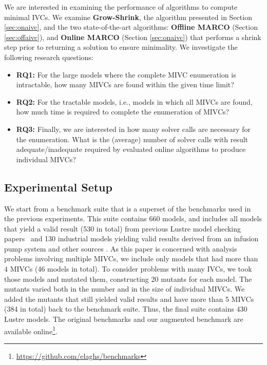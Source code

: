 We are interested in examining the performance of algorithms to compute minimal IVCs.
We examine \textbf{Grow-Shrink}, the algorithm presented in Section \ref{sec:onaivc}, and the two state-of-the-art algorithms: \textbf{Offline MARCO} (\aivcalg Section \ref{sec:offaivc}), and \textbf{Online MARCO} (Section \ref{sec:onaivc}) that performs a shrink step prior to returning a solution to ensure minimality.
We investigate the following research questions:
\begin{itemize}
  \item \textbf{RQ1:} For the large models where the complete MIVC enumeration is intractable,
how many MIVCs are found within the given time limit?
  \item \textbf{RQ2:} For the tractable models, i.e., models in which all MIVCs are found, how much time is required to complete the enumeration of MIVCs?
  \item \textbf{RQ3:} Finally, we are interested in how many solver calls are necessary for the enumeration. What is the (average) number of solver calls with result adequate/inadequate required by evaluated online algorithms to produce individual MIVCs?
\end{itemize}

\subsection{Experimental Setup}
  We start from a benchmark suite that is a superset of the benchmarks used in the previous experiments. This suite contains 660 models, and includes all models that yield a valid result (530 in total) from previous Lustre model checking papers~\cite{Hagen08:FMCAD,piskac2016} and 130 industrial models yielding valid results derived from an infusion pump system \cite{hilt2013} and other sources \cite{piskac2016,NFM2015:backes}.
As this paper is concerned with analysis problems involving multiple MIVCs, we include only models that had more than 4 MIVCs (46 models in total).  To consider problems with many IVCs, we took those models and mutated them, constructing 20 mutants for each model. The mutants varied both in the number and in the size of individual MIVCs.
We added the mutants that still yielded valid results and have more than 5 MIVCs (384 in total) back to the benchmark suite.
Thus, the final suite contains 430 Lustre models. The original benchmarks and our augmented benchmark are available online\footnote{\url{https://github.com/elaghs/benchmarks}}.

